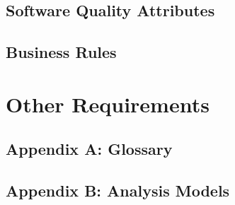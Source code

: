 \documentclass[11pt]{article}
\begin{document}
\subsection{Software Quality Attributes}
\label{sec:orgebf762d}
\subsection{Business Rules}
\label{sec:orgead8acc}
\section{Other Requirements}
\label{sec:orgca19dc7}
\subsection*{Appendix A: Glossary}
\label{sec:org0523146}
\subsection*{Appendix B: Analysis Models}
\label{sec:org5392567}
\end{document}
